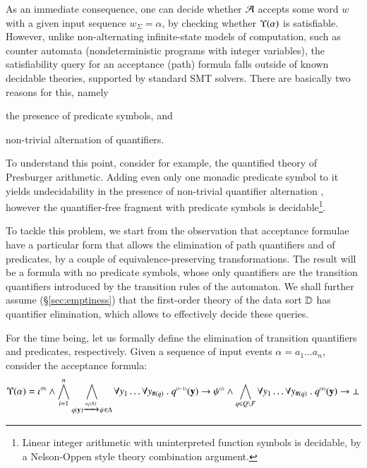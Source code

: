 \documentclass{llncs}
\begin{document}
As an immediate consequence, one can decide whether $\mathcal{A}$ accepts some
word $w$ with a given input sequence $w_\Sigma=\alpha$, by checking
whether $\Upsilon({\alpha})$ is satisfiable. However, unlike
non-alternating infinite-state models of computation, such as counter
automata (nondeterministic programs with integer variables), the
satisfiability query for an acceptance (path) formula falls outside of
known decidable theories, supported by standard SMT solvers. There are
basically two reasons for this, namely \begin{inparaenum}[(i)]
\item the presence of predicate symbols, and
\item non-trivial alternation of quantifiers.
\end{inparaenum}
To understand this point, consider for example, the quantified theory
of Presburger arithmetic. Adding even only one monadic predicate
symbol to it yields undecidability in the presence of non-trivial
quantifier alternation \cite{Halpern91}, however the quantifier-free
fragment with predicate symbols is decidable\footnote{Linear integer
  arithmetic with uninterpreted function symbols is decidable, by a
  Nelson-Oppen style theory combination argument.}.

To tackle this problem, we start from the observation that acceptance
formulae have a particular form that allows the elimination of path
quantifiers and of predicates, by a couple of equivalence-preserving
transformations. The result will be a formula with no predicate
symbols, whose only quantifiers are the transition quantifiers
introduced by the transition rules of the automaton. We shall further
assume (\S\ref{sec:emptiness}) that the first-order theory of the data
sort $\mathbb{D}$ has quantifier elimination, which allows to effectively
decide these queries. 

For the time being, let us formally define the elimination of
transition quantifiers and predicates, respectively. Given a sequence
of input events $\alpha = a_1 \ldots a_n$, consider the acceptance
formula: 
\[\Upsilon({\alpha}) = {\iota}^{\scriptscriptstyle{({0})}} \wedge 
\bigwedge_{i=1}^n \bigwedge_{q(\mathbf y) \xrightarrow{{\scriptscriptstyle a_i(X)}}_{{\scriptstyle }} \psi \in
  \Delta} \forall y_1 \ldots \forall y_{\#(q)} ~.~
{q}^{\scriptscriptstyle{({i-1})}}(\mathbf y) \rightarrow {\psi}^{\scriptscriptstyle{({i})}} \wedge
\bigwedge_{q \in Q \setminus F} \forall y_1 \ldots \forall y_{\#(q)}
~.~ {q}^{\scriptscriptstyle{({n})}}(\mathbf y) \rightarrow \bot\]
\end{document}
